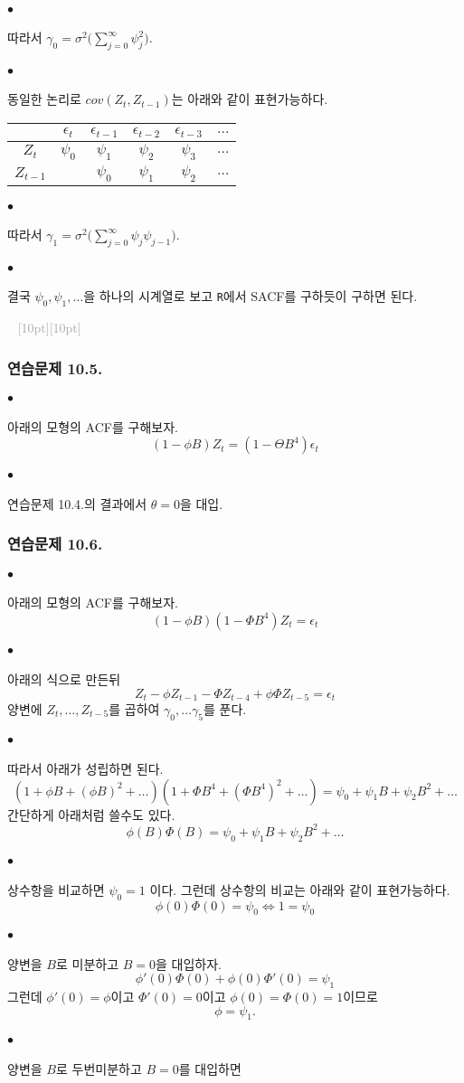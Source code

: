 \documentclass[12pt,oneside,english]{book}
\newcommand{\dash}{\vspace{2em}\noindent \textcolor{darkgray}{\hrulefill~ \raisebox{-2.5pt}[10pt][10pt]{\leafright \decofourleft \decothreeleft  \aldineright \decotwo \floweroneleft \decoone   \floweroneright \decotwo \aldineleft\decothreeright \decofourright \leafleft} ~  \hrulefill \\ \vspace{2em}}}
\def\ck{\paragraph{\Large$\bullet$}\Large}
\begin{document}
\ck 따라서 $\gamma_0=\sigma^2\big(\sum_{j=0}^{\infty}\psi_j^2\big).$

\ck 동일한 논리로 $cov(Z_t,Z_{t-1})$는 아래와 같이 표현가능하다. 
\begin{table}[h]
\center\Large
\begin{tabular}{|c|c|c|c|c|c|}
\hline
      & $\epsilon_t$      & $\epsilon_{t-1}$ & $\epsilon_{t-2}$ & $\epsilon_{t-3}$ & $\dots$ \\ \hline
$Z_t$ & $\psi_0$ 		  & $\psi_1$         & $\psi_2$         & $\psi_3$         & $\dots$ \\ \hline
$Z_{t-1}$ & 			  & $\psi_0$         & $\psi_1$         & $\psi_2$         & $\dots$ \\ \hline
\end{tabular}
\end{table}

\ck 따라서 $\gamma_1=\sigma^2\big(\sum_{j=0}^{\infty}\psi_j\psi_{j-1}\big).$

\ck 결국 $\psi_0,\psi_1,\dots$을 하나의 시계열로 보고 {\tt R}에서 SACF를 구하듯이 구하면 된다. 

\dash 

\subsubsection{연습문제 10.5.}

\ck 아래의 모형의 ACF를 구해보자.
\[
(1-\phi B)Z_t=(1-\Theta B^4)\epsilon_t
\]

\ck 연습문제 10.4.의 결과에서 $\theta=0$을 대입. 

\subsubsection{연습문제 10.6.}

\ck 아래의 모형의 ACF를 구해보자.
\[
(1-\phi B)(1-\Phi B^4)Z_t=\epsilon_t
\]


\ck 아래의 식으로 만든뒤 
\[
Z_t-\phi Z_{t-1}- \Phi Z_{t-4} +\phi\Phi Z_{t-5}=\epsilon_t
\]
양변에 $Z_{t},\dots,Z_{t-5}$를 곱하여 $\gamma_0,\dots \gamma_5$를 푼다. 

\ck 따라서 아래가 성립하면 된다. 
\[
(1+\phi B +(\phi B)^2+\dots)(1+\Phi B^4 +(\Phi B^4)^2 + \dots)= \psi_0+\psi_1 B+ \psi_2 B^2 +\dots 
\]
간단하게 아래처럼 쓸수도 있다. 
\[
\phi(B)\Phi(B)= \psi_0+\psi_1 B+ \psi_2 B^2 +\dots 
\]

\ck 상수항을 비교하면 $\psi_0=1$ 이다. 그런데 상수항의 비교는 아래와 같이 표현가능하다. 
\[
\phi(0)\Phi(0)=\psi_0 \Longleftrightarrow 1=\psi_0
\]

\ck 양변을 $B$로 미분하고 $B=0$을 대입하자. 
\[
\phi'(0)\Phi(0)+\phi(0)\Phi'(0)=\psi_1
\]
그런데 $\phi'(0)=\phi$이고 $\Phi'(0)=0$이고 $\phi(0)=\Phi(0)=1$이므로 
\[
\phi=\psi_1.
\]

\ck 양변을 $B$로 두번미분하고 $B=0$를 대입하면 
\end{document}
